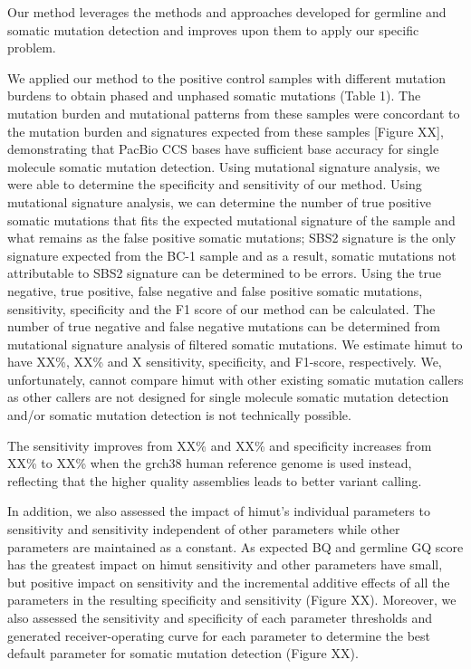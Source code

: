 Our method leverages the methods and approaches developed for germline and somatic mutation detection and improves upon them to apply our specific problem. 

We applied our method to the positive control samples with different mutation burdens to obtain phased and unphased somatic mutations (Table 1). The mutation burden and mutational patterns from these samples were concordant to the mutation burden and signatures expected from these samples [Figure XX], demonstrating that PacBio CCS bases have sufficient base accuracy for single molecule somatic mutation detection.
Using mutational signature analysis, we were able to determine the specificity and sensitivity of our method. Using mutational signature analysis, we can determine the number of true positive somatic mutations that fits the expected mutational signature of the sample and what remains as the false positive somatic mutations; SBS2 signature is the only signature expected from the BC-1 sample and as a result, somatic mutations not attributable to SBS2 signature can be determined to be errors. Using the true negative, true positive, false negative and false positive somatic mutations, sensitivity, specificity and the F1 score of our method can be calculated. The number of true negative and false negative mutations can be determined from mutational signature analysis of filtered somatic mutations. We estimate himut to have XX\%, XX\% and X sensitivity, specificity, and F1-score, respectively. We, unfortunately, cannot compare himut with other existing somatic mutation callers as other callers are not designed for single molecule somatic mutation detection and/or somatic mutation detection is not technically possible. 

The sensitivity improves from XX\% and XX\% and specificity increases from XX\% to XX\% when the grch38 human reference genome is used instead, reflecting that the higher quality assemblies leads to better variant calling. 

In addition, we also assessed the impact of himut’s individual parameters to sensitivity and sensitivity independent of other parameters while other parameters are maintained as a constant. As expected BQ and germline GQ score has the greatest impact on himut sensitivity and other parameters have small, but positive impact on sensitivity and the incremental additive effects of all the parameters in the resulting specificity and sensitivity (Figure XX). Moreover, we also assessed the sensitivity and specificity of each parameter thresholds and generated receiver-operating curve for each parameter to determine the best default parameter for somatic mutation detection (Figure XX). 

